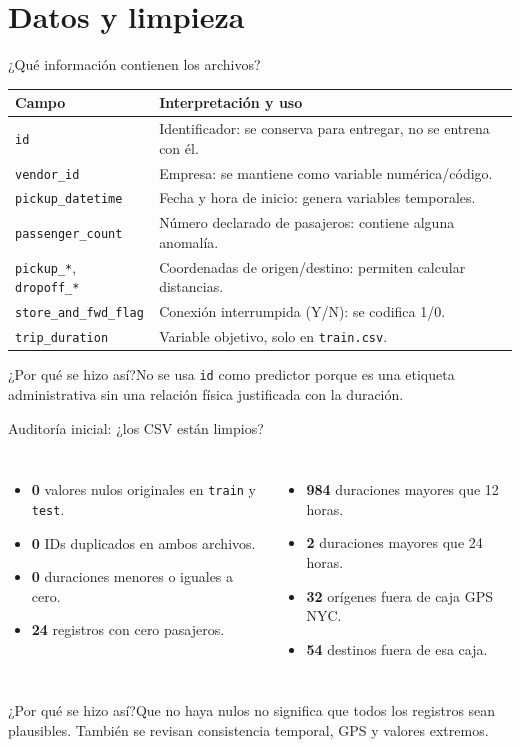 \documentclass[aspectratio=169,11pt]{beamer}
\newcommand{\porq}[1]{\vspace{1.2mm}\begin{block}{¿Por qué se hizo así?}\small #1\end{block}}
\begin{document}
\section{Datos y limpieza}
\begin{frame}{¿Qué información contienen los archivos?}
\small
\begin{tabular}{p{.28\linewidth}p{.66\linewidth}}
\toprule
\textbf{Campo} & \textbf{Interpretación y uso}\tabularnewline\midrule
\texttt{id} & Identificador: se conserva para entregar, no se entrena con él.\\
\texttt{vendor\_id} & Empresa: se mantiene como variable numérica/código.\\
\texttt{pickup\_datetime} & Fecha y hora de inicio: genera variables temporales.\\
\texttt{passenger\_count} & Número declarado de pasajeros: contiene alguna anomalía.\\
\texttt{pickup\_*}, \texttt{dropoff\_*} & Coordenadas de origen/destino: permiten calcular distancias.\\
\texttt{store\_and\_fwd\_flag} & Conexión interrumpida (Y/N): se codifica 1/0.\\
\texttt{trip\_duration} & Variable objetivo, solo en \texttt{train.csv}.\\
\bottomrule
\end{tabular}
\porq{No se usa \texttt{id} como predictor porque es una etiqueta administrativa sin una relación física justificada con la duración.}
\end{frame}

\begin{frame}{Auditoría inicial: ¿los CSV están limpios?}
\begin{columns}[T]
  \begin{itemize}
    \item \textbf{0} valores nulos originales en \texttt{train} y \texttt{test}.
    \item \textbf{0} IDs duplicados en ambos archivos.
    \item \textbf{0} duraciones menores o iguales a cero.
    \item \textbf{24} registros con cero pasajeros.
  \end{itemize}
  \begin{itemize}
    \item \textbf{984} duraciones mayores que 12 horas.
    \item \textbf{2} duraciones mayores que 24 horas.
    \item \textbf{32} orígenes fuera de caja GPS NYC.
    \item \textbf{54} destinos fuera de esa caja.
  \end{itemize}
\end{columns}
\porq{Que no haya nulos no significa que todos los registros sean plausibles. También se revisan consistencia temporal, GPS y valores extremos.}
\end{frame}
\end{document}

